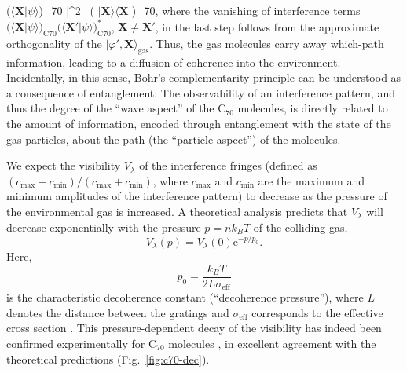 \documentclass[twocolumn,aps,floatfix,amsmath,amssymb,showpacs,nofootinbib]{revtex4}
\newcommand{\be}{\begin{equation}} \newcommand{\ee}{\end{equation}}
\newcommand{\ket}[1]{\ensuremath{|{#1\rangle}}}
\newcommand{\braket}[2]{\ensuremath{{\langle #1}|{#2 \rangle}}}
\newcommand{\ketbra}[2]{\ensuremath{|{#1 \rangle}{\langle #2}|}}
\newcommand{\e}{\ensuremath{\mathrm{e}}}
\begin{document}
\bigl(\braket{\mathbf{X}}{\psi}\bigr)_{70} \bigr|^2 \,
\bigl( \ketbra{\mathbf{X}}{\mathbf{X}}\bigr)_{70},
\eea
%
where the vanishing of interference terms
$\bigl(\braket{\mathbf{X}}{\psi}\bigr)_{\text{C}70}
\bigl(\braket{\mathbf{X}'}{\psi}\bigr)_{\text{C}70}^*$, $\mathbf{X}
\not= \mathbf{X}'$, in the last step follows from the approximate
orthogonality of the $\ket{\varphi', \mathbf{X}}_\text{gas} $.  Thus,
the gas molecules carry away which-path information, leading to a
diffusion of coherence into the environment. Incidentally, in this
sense, Bohr's complementarity principle can be understood as a
consequence of entanglement: The observability of an interference
pattern, and thus the degree of the ``wave aspect'' of the C$_{70}$
molecules, is directly related to the amount of information, encoded
through entanglement with the state of the gas particles, about the
path (the ``particle aspect'') of the molecules.

We expect the visibility $V_\lambda$ of the interference fringes
(defined as $(c_\text{max} - c_\text{min}) / (c_\text{max} +
c_\text{min})$, where $c_\text{max}$ and $c_\text{min}$ are the
maximum and minimum amplitudes of the interference pattern) to
decrease as the pressure of the environmental gas is increased. A
theoretical analysis
\cite{Hackermuller:2003:uu,Hornberger:2003:un,Hornberger:2004:bb}
predicts that $V_\lambda$ will decrease exponentially with the
pressure $p = n k_B T$ of the colliding gas,
%
\be \label{eq:vis1}
V_\lambda(p) = V_\lambda(0) \e^{-p/p_0}.
\ee
%
Here, 
%
\be \label{eq:vis2}
p_0 = \frac{k_B T}{2L \sigma_\text{eff}}
\ee
%
is the characteristic decoherence constant (``decoherence pressure''),
where $L$ denotes the distance between the gratings and
$\sigma_\text{eff}$ corresponds to the effective cross section
\cite{Hackermuller:2003:uu}. This pressure-dependent decay of the
visibility has indeed been confirmed experimentally for C$_{70}$
molecules \cite{Hackermuller:2003:uu,Hornberger:2003:tv}, in excellent
agreement with the theoretical predictions (Fig.~\ref{fig:c70-dec}).
\end{document}
